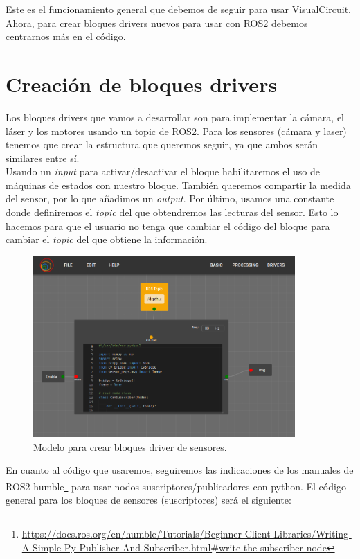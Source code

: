 Este es el funcionamiento general que debemos de seguir para usar VisualCircuit. Ahora, para crear bloques drivers nuevos para usar con ROS2
debemos centrarnos más en el código.

\section{Creación de bloques drivers}
\label{sec:drivers_creacion}

Los bloques drivers que vamos a desarrollar son para implementar la cámara, el láser y los motores usando un topic de ROS2.
Para los sensores (cámara y laser) tenemos que crear la estructura que queremos seguir, ya que ambos serán similares entre sí.\\

Usando un \textit{input} para activar/desactivar el bloque habilitaremos el uso de máquinas de estados con nuestro bloque.
También queremos compartir la medida del sensor, por lo que añadimos un \textit{output}. Por último, usamos una constante donde definiremos
el \textit{topic} del que obtendremos las lecturas del sensor. Esto lo hacemos para que el usuario no tenga que cambiar el código del bloque para cambiar
el \textit{topic} del que obtiene la información.\\
\begin{figure} [H]
  \begin{center}
      \includegraphics[width=10cm]{figs/c4/VC_driver_blocks.png}
  \end{center}
  \caption[Modelo bloque driver sensores]{Modelo para crear bloques driver de sensores.}
  \label{fig:VC_driver_model}
\end{figure}

En cuanto al código que usaremos, seguiremos las indicaciones de los manuales de
ROS2-humble\footnote{\url{https://docs.ros.org/en/humble/Tutorials/Beginner-Client-Libraries/Writing-A-Simple-Py-Publisher-And-Subscriber.html\#write-the-subscriber-node}}
para usar nodos suscriptores/publicadores con python. El código general para los bloques de sensores (suscriptores) será el siguiente:

